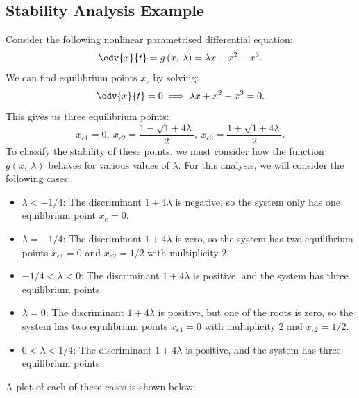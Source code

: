 \documentclass{article}
\begin{document}
\subsection{Stability Analysis Example}
Consider the following nonlinear parametrised differential equation:
\begin{equation*}
    \odv{x}{t} = g\left( x,\: \lambda \right) = \lambda x + x^2 - x^3.
\end{equation*}
We can find equilibrium points \(x_e\) by solving:
\begin{equation*}
    \odv{x}{t} = 0 \implies \lambda x + x^2 - x^3 = 0.
\end{equation*}
This gives us three equilibrium points:
\begin{equation*}
    x_{e1} = 0,\: x_{e2} = \frac{1 - \sqrt{1 + 4\lambda}}{2},\: x_{e3} = \frac{1 + \sqrt{1 + 4\lambda}}{2}.
\end{equation*}
To classify the stability of these points, we must consider how the
function \(g\left( x,\: \lambda \right)\) behaves for various values of
\(\lambda\). For this analysis, we will consider the following cases:
\begin{itemize}
    \item \(\lambda < -1/4\): The discriminant \(1 + 4 \lambda\) is
          negative, so the system only has one equilibrium point
          \(x_e = 0\).
    \item \(\lambda = -1/4\): The discriminant \(1 + 4 \lambda\) is
          zero, so the system has two equilibrium points
          \(x_{e1} = 0\) and \(x_{e2} = 1/2\) with multiplicity 2.
    \item \(-1/4 < \lambda < 0\): The discriminant \(1 + 4 \lambda\) is
          positive, and the system has three equilibrium points.
    \item \(\lambda = 0\): The discriminant \(1 + 4 \lambda\) is
          positive, but one of the roots is zero, so the system has two
          equilibrium points \(x_{e1} = 0\) with multiplicity 2 and
          \(x_{e2} = 1/2\).
    \item \(0 < \lambda < 1/4\): The discriminant \(1 + 4 \lambda\) is
          positive, and the system has three equilibrium points.
\end{itemize}
A plot of each of these cases is shown below:
\end{document}
